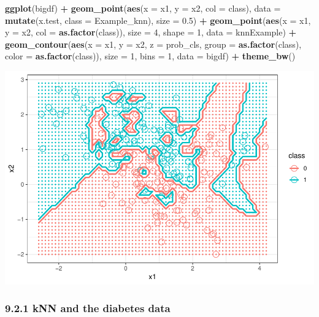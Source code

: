 \documentclass[]{article}
\newenvironment{Shaded}{\begin{snugshade}}{\end{snugshade}}
\newcommand{\KeywordTok}[1]{\textcolor[rgb]{0.13,0.29,0.53}{\textbf{#1}}}
\newcommand{\DataTypeTok}[1]{\textcolor[rgb]{0.13,0.29,0.53}{#1}}
\newcommand{\DecValTok}[1]{\textcolor[rgb]{0.00,0.00,0.81}{#1}}
\newcommand{\FloatTok}[1]{\textcolor[rgb]{0.00,0.00,0.81}{#1}}
\newcommand{\StringTok}[1]{\textcolor[rgb]{0.31,0.60,0.02}{#1}}
\newcommand{\OperatorTok}[1]{\textcolor[rgb]{0.81,0.36,0.00}{\textbf{#1}}}
\newcommand{\NormalTok}[1]{#1}
\begin{document}
\begin{Shaded}
\begin{Highlighting}[]
\KeywordTok{ggplot}\NormalTok{(bigdf) }\OperatorTok{+}\StringTok{ }\KeywordTok{geom_point}\NormalTok{(}\KeywordTok{aes}\NormalTok{(}\DataTypeTok{x =}\NormalTok{ x1, }\DataTypeTok{y =}\NormalTok{ x2, }\DataTypeTok{col =}\NormalTok{ class), }\DataTypeTok{data =} \KeywordTok{mutate}\NormalTok{(x.test, }\DataTypeTok{class =}\NormalTok{ Example_knn), }\DataTypeTok{size =} \FloatTok{0.5}\NormalTok{) }\OperatorTok{+}
\StringTok{    }\KeywordTok{geom_point}\NormalTok{(}\KeywordTok{aes}\NormalTok{(}\DataTypeTok{x =}\NormalTok{ x1, }\DataTypeTok{y =}\NormalTok{ x2, }\DataTypeTok{col =} \KeywordTok{as.factor}\NormalTok{(class)), }\DataTypeTok{size =} \DecValTok{4}\NormalTok{, }\DataTypeTok{shape =} \DecValTok{1}\NormalTok{, }\DataTypeTok{data =}\NormalTok{ knnExample) }\OperatorTok{+}\StringTok{ }
\StringTok{    }\KeywordTok{geom_contour}\NormalTok{(}\KeywordTok{aes}\NormalTok{(}\DataTypeTok{x =}\NormalTok{ x1, }\DataTypeTok{y =}\NormalTok{ x2, }\DataTypeTok{z =}\NormalTok{ prob_cls, }\DataTypeTok{group =} \KeywordTok{as.factor}\NormalTok{(class), }\DataTypeTok{color =} \KeywordTok{as.factor}\NormalTok{(class)), }\DataTypeTok{size =} \DecValTok{1}\NormalTok{, }\DataTypeTok{bins =} \DecValTok{1}\NormalTok{, }\DataTypeTok{data =}\NormalTok{ bigdf) }\OperatorTok{+}\StringTok{ }
\StringTok{    }\KeywordTok{theme_bw}\NormalTok{()}
\end{Highlighting}
\end{Shaded}

\includegraphics{stt-301-programming_files/figure-latex/unnamed-chunk-197-1.pdf}

\subsubsection{9.2.1 kNN and the diabetes
data}\label{knn-and-the-diabetes-data}
\end{document}
